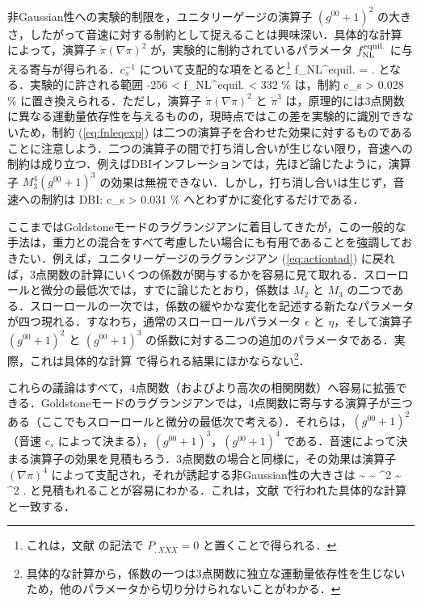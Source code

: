 非Gaussian性への実験的制限を，ユニタリーゲージの演算子 $(g^{00}+1)^2$ の大きさ，したがって音速に対する制約として捉えることは興味深い．具体的な計算 \cite{Chen:2006nt} によって，演算子 $\dot\pi
(\nabla\pi)^2$ が，実験的に制約されているパラメータ $f_{\rm
  NL}^{\rm equil.}$ に与える寄与が得られる．$c_s^{-1}$ について支配的な項をとると\footnote{これは，文献 \cite{Chen:2006nt} の記法で $P_{,XXX}=0$ と置くことで得られる．}
\be
f_{\rm NL}^{\rm equil.} =  \cdot {} \;.
\ee
となる．実験的に許される範囲 \cite{Creminelli:2006rz}
\be
\label{eq:fnleqexp}
-256 < f_{\rm NL}^{\rm equil.} < 332  \% 
\ee
は，制約
\be
c_s > 0.028  \% 
\ee
に置き換えられる．ただし，演算子 $\dot\pi (\nabla\pi)^2$ と $\dot\pi^3$ は，原理的には3点関数に異なる運動量依存性を与えるものの，現時点ではこの差を実験的に識別できないため，制約 (\ref{eq:fnleqexp}) は二つの演算子を合わせた効果に対するものであることに注意しよう．二つの演算子の間で打ち消し合いが生じない限り，音速への制約は成り立つ．例えばDBIインフレーションでは，先ほど論じたように，演算子 $M_3^4 (g^{00}+1)^3$ の効果は無視できない．しかし，打ち消し合いは生じず，音速への制約は
\be
{\rm DBI:} \quad c_s > 0.031  \% 
\ee
へとわずかに変化するだけである．

ここまではGoldstoneモードのラグランジアンに着目してきたが，この一般的な手法は，重力との混合をすべて考慮したい場合にも有用であることを強調しておきたい．例えば，ユニタリーゲージのラグランジアン (\ref{eq:actiontad}) に戻れば，3点関数の計算にいくつの係数が関与するかを容易に見て取れる．スローロールと微分の最低次では，すでに論じたとおり，係数は $M_2$ と $M_3$ の二つである．スローロールの一次では，係数の緩やかな変化を記述する新たなパラメータが四つ現れる．すなわち，通常のスローロールパラメータ $\epsilon$ と $\eta$，そして演算子 $(g^{00}+1)^2$ と $(g^{00}+1)^3$ の係数に対する二つの追加のパラメータである．実際，これは具体的な計算 \cite{Chen:2006nt} で得られる結果にほかならない\footnote{具体的な計算から，係数の一つは3点関数に独立な運動量依存性を生じないため，他のパラメータから切り分けられないことがわかる．}．

これらの議論はすべて，4点関数（およびより高次の相関関数）へ容易に拡張できる．Goldstoneモードのラグランジアンでは，4点関数に寄与する演算子が三つある（ここでもスローロールと微分の最低次で考える）．それらは，$(g^{00}+1)^2$ （音速 $c_s$ によって決まる），$(g^{00}+1)^3$，$(g^{00}+1)^4$ である．音速によって決まる演算子の効果を見積もろう．3点関数の場合と同様に，その効果は演算子 $(\nabla\pi)^4$ によって支配され，それが誘起する非Gaussian性の大きさは
\be
{}\sim {} \sim {}
\pi^2 \sim {} \zeta^2 \;.
\ee
と見積もれることが容易にわかる．これは，文献 \cite{Chen:2006dfn} で行われた具体的な計算と一致する．

